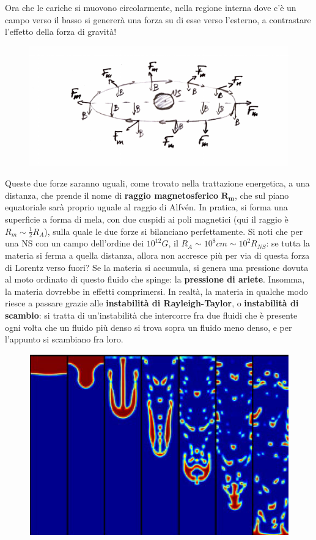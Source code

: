 Ora che le cariche si muovono circolarmente, nella regione interna dove c'è un campo verso il basso si genererà una forza su di esse verso l'esterno, a contrastare l'effetto della forza di gravità!
\begin{figure}[h!]
    \centering
    \includegraphics[width=0.65\linewidth]{Immagini/carica in orbita fase 3.pdf}
    \label{fig: carica in orbita fase 3}
\end{figure}
Queste due forze saranno uguali, come trovato nella trattazione energetica, a una distanza, che prende il nome di \textbf{raggio magnetosferico} $\mathbf{R_m}$, che sul piano equatoriale sarà proprio uguale al raggio di Alfvén. 
In pratica, si forma una superficie a forma di mela, con due cuspidi ai poli magnetici (qui il raggio è $R_m\sim\frac{1}{2}R_A $), sulla quale le due forze si bilanciano perfettamente.
Si noti che per una NS con un campo dell'ordine dei $10^{12}G$, il $R_A\sim10^8cm \sim10^2R_{NS} $: se tutta la materia si ferma a quella distanza, allora non accresce più per via di questa forza di Lorentz verso fuori?
Se la materia si accumula, si genera una pressione dovuta al moto ordinato di questo fluido che spinge: la \textbf{pressione di ariete}.
Insomma, la materia dovrebbe in effetti comprimersi.
In realtà, la materia in qualche modo riesce a passare grazie alle \textbf{instabilità di Rayleigh-Taylor}, o \textbf{instabilità di scambio}: si tratta di un'instabilità che intercorre fra due fluidi che è presente ogni volta che un fluido più denso si trova sopra un fluido meno denso, e per l'appunto si scambiano fra loro.
\begin{figure}[h!]
    \centering
    \includegraphics[width=0.4\linewidth]{Immagini/RT_instability.png}
    \label{fig: R-T instability}
\end{figure}\\
